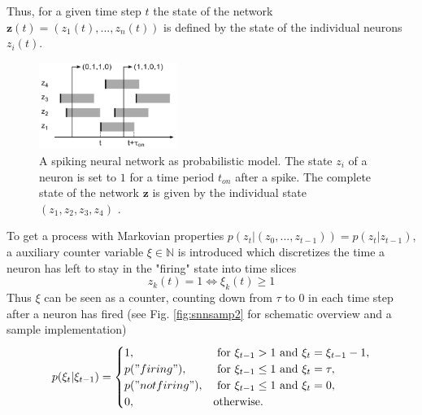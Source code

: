 Thus, for a given time step $t$ the state of the network $\textbf{z}(t) = (z_1(t), ... ,z_n(t))$ is defined by the state of the individual neurons $z_i(t)$. 


\begin{figure}
	\centering
    	\includegraphics[width=0.4\textwidth]{imgs/snn_sample1.png} 
    \caption[A spiking neural network as probabilistic model.]{A spiking neural network as probabilistic model. The state $z_i$ of a neuron is set to $1$ for a time period $t_{on}$ after a spike. The complete state of the network $\textbf{z}$ is given by the individual state $(z_1, z_2, z_3, z_4)$  \cite{Petrovici2016}.}
	\label{fig:snnsamp1}
\end{figure}

To get a process with Markovian properties $p(z_t| (z_0, ..., z_{t-1})) = p(z_t| z_{t-1}) $, a auxiliary counter variable $\xi \in \mathbb{N}$ is introduced which discretizes the time a neuron has left to stay in the "firing" state into time slices
\[
z_k(t) = 1 \iff \xi_k(t) \ge 1
\]
Thus $\xi$ can be seen as a counter, counting down from $\tau$ to $0$ in each time step after a neuron has fired (see Fig. \ref{fig:snnsamp2} for schematic overview and a sample implementation)
\[
p(\xi_t | \xi_{t-1}) = 
\begin{cases}
	1, & \text{ for } \xi_{t-1} > 1 \text{ and } \xi_t = \xi_{t-1} -1 ,\\
	p("firing"), & \text{ for } \xi_{t-1} \le 1 \text{ and } \xi_t = \tau ,\\
	p("not firing"), & \text{ for } \xi_{t-1} \le 1 \text{ and } \xi_t = 0 ,\\
	0, & \text{otherwise}.
\end{cases}
\]


